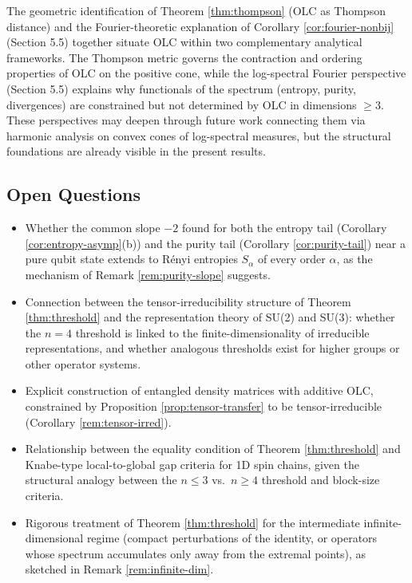 \documentclass{article}
\theoremstyle{remark}
\begin{document}
The geometric identification of Theorem \ref{thm:thompson} (OLC as Thompson distance) and the Fourier-theoretic explanation of Corollary \ref{cor:fourier-nonbij} (Section 5.5) together situate OLC within two complementary analytical frameworks. The Thompson metric governs the contraction and ordering properties of OLC on the positive cone, while the log-spectral Fourier perspective (Section 5.5) explains why functionals of the spectrum (entropy, purity, divergences) are constrained but not determined by OLC in dimensions $\ge3$. These perspectives may deepen through future work connecting them via harmonic analysis on convex cones of log-spectral measures, but the structural foundations are already visible in the present results.

\subsection{Open Questions}\label{sec:open}
\begin{itemize}
\item Whether the common slope $-2$ found for both the entropy tail (Corollary \ref{cor:entropy-asymp}(b)) and the purity tail (Corollary \ref{cor:purity-tail}) near a pure qubit state extends to R\'enyi entropies $S_\alpha$ of every order $\alpha$, as the mechanism of Remark \ref{rem:purity-slope} suggests.
\item Connection between the tensor-irreducibility structure of Theorem \ref{thm:threshold} and the representation theory of SU(2) and SU(3): whether the $n=4$ threshold is linked to the finite-dimensionality of irreducible representations, and whether analogous thresholds exist for higher groups or other operator systems.
\item Explicit construction of entangled density matrices with additive OLC, constrained by Proposition \ref{prop:tensor-transfer} to be tensor-irreducible (Corollary \ref{rem:tensor-irred}).
\item Relationship between the equality condition of Theorem \ref{thm:threshold} and Knabe-type local-to-global gap criteria for 1D spin chains, given the structural analogy between the $n\le3$ vs.\ $n\ge4$ threshold and block-size criteria.
\item Rigorous treatment of Theorem \ref{thm:threshold} for the intermediate infinite-dimensional regime (compact perturbations of the identity, or operators whose spectrum accumulates only away from the extremal points), as sketched in Remark \ref{rem:infinite-dim}.
\end{itemize}
\end{document}
